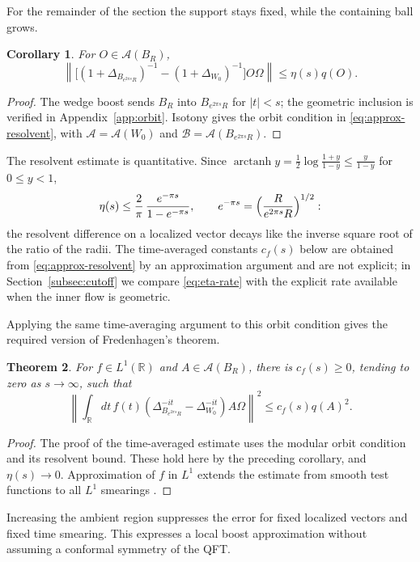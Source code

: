 \documentclass[a4paper,11pt]{article}
\newtheorem{theorem}{Theorem}
\newtheorem{corollary}[theorem]{Corollary}
\theoremstyle{definition}
\begin{document}
For the remainder of the section the support stays fixed, while the containing ball grows.
\begin{corollary}\label{cor:growing-resolvent}
For $O\in\mathcal A(B_R)$,
\begin{equation}
 \left\|\bigl[(1+\Delta_{B_{e^{2\pi s}R}})^{-1}
 -(1+\Delta_{W_0})^{-1}\bigr]O\Omega\right\|
 \leq\eta(s)q(O).
 \label{eq:approx-growing-resolvent}
\end{equation}
\end{corollary}
\begin{proof}
The wedge boost sends $B_R$ into $B_{e^{2\pi s}R}$ for $|t|<s$; the geometric inclusion is verified in Appendix~\ref{app:orbit}. Isotony gives the orbit condition in \eqref{eq:approx-resolvent}, with $\mathcal A=\mathcal A(W_0)$ and $\mathcal B=\mathcal A(B_{e^{2\pi s}R})$.
\end{proof}

The resolvent estimate is quantitative. Since $\operatorname{arctanh}y=\tfrac12\log\frac{1+y}{1-y}\le\frac{y}{1-y}$ for $0\le y<1$,
\begin{equation}
 \eta(s)\le\frac2\pi\,\frac{e^{-\pi s}}{1-e^{-\pi s}},\qquad e^{-\pi s}=\Bigl(\frac{R}{e^{2\pi s}R}\Bigr)^{1/2}:
 \label{eq:eta-rate}
\end{equation}
the resolvent difference on a localized vector decays like the inverse square root of the ratio of the radii. The time-averaged constants $c_f(s)$ below are obtained from \eqref{eq:approx-resolvent} by an approximation argument and are not explicit; in Section~\ref{subsec:cutoff} we compare \eqref{eq:eta-rate} with the explicit rate available when the inner flow is geometric.

Applying the same time-averaging argument to this orbit condition gives the required version of Fredenhagen's theorem.
\begin{theorem}\label{theorem:modifiedfredenhagen}
For $f\in L^1(\mathbb R)$ and $A\in\mathcal A(B_R)$, there is $c_f(s)\geq0$, tending to zero as $s\to\infty$, such that
\begin{equation}
 \left\|\int_{\mathbb R}dt\,f(t)
 (\Delta_{B_{e^{2\pi s}R}}^{-it}-\Delta_{W_0}^{-it})A\Omega\right\|^2
 \leq c_f(s)q(A)^2.
 \label{eq:approx-growing-flow}
\end{equation}
\end{theorem}
\begin{proof}
The proof of the time-averaged estimate uses the modular orbit condition and its resolvent bound. These hold here by the preceding corollary, and $\eta(s)\to0$. Approximation of $f$ in $L^1$ extends the estimate from smooth test functions to all $L^1$ smearings \cite{fredenhagen}.
\end{proof}
Increasing the ambient region suppresses the error for fixed localized vectors and fixed time smearing. This expresses a local boost approximation without assuming a conformal symmetry of the QFT.
\end{document}
